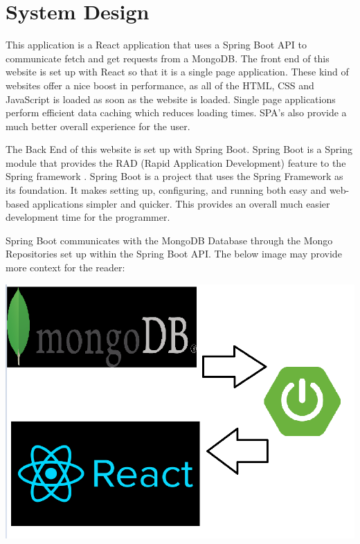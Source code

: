 \chapter{System Design}
This application is a React application that uses a Spring Boot API to communicate fetch and get requests from a MongoDB. The front end of this website is set up with React so that it is a single page application. These kind of websites offer a nice boost in performance, as all of the HTML, CSS and JavaScript is loaded as soon as the website is loaded. Single page applications perform efficient data caching which reduces loading times. SPA's also provide a much better overall experience for the user. \par
The Back End of this website is set up with Spring Boot. Spring Boot is a Spring module that provides the RAD (Rapid Application Development) feature to the Spring framework \cite{Javapoint}. Spring Boot is a project that uses the Spring Framework as its foundation.
It makes setting up, configuring, and running both easy and web-based applications simpler and quicker. This provides an overall much easier development time for the programmer. \par
Spring Boot communicates with the MongoDB Database through the Mongo Repositories set up within the Spring Boot API. The below image may provide more context for the reader: \par
\includegraphics[scale=0.5]{img/architecture.png}

